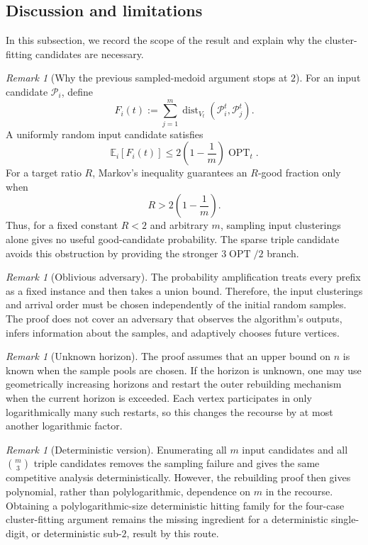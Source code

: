 \documentclass[11pt]{article}
\theoremstyle{definition}
\theoremstyle{remark}
\newtheorem{remark}[theorem]{Remark}
\newcommand{\Pp}{\mathcal P}
\newcommand{\OPT}{\operatorname{OPT}}
\newcommand{\dist}{\operatorname{dist}}
\newcommand{\1}{\mathbf 1}
\begin{document}
\subsection{Discussion and limitations}

In this subsection, we record the scope of the result and explain why the
cluster-fitting candidates are necessary.

\begin{remark}[Why the previous sampled-medoid argument stops at $2$]
For an input candidate $\Pp_i$, define
\[
 F_i(t):=\sum_{j=1}^m\dist_{V_t}(\Pp_i^t,\Pp_j^t).
\]
A uniformly random input candidate satisfies
\[
 \mathbb E_i[F_i(t)]
 \le2\left(1-\frac1m\right)\OPT_t.
\]
For a target ratio $R$, Markov's inequality guarantees an $R$-good fraction
only when
\[
 R>2\left(1-\frac1m\right).
\]
Thus, for a fixed constant $R<2$ and arbitrary $m$, sampling input
clusterings alone gives no useful good-candidate probability.  The sparse
triple candidate avoids this obstruction by providing the stronger
$3\OPT/2$ branch.
\end{remark}

\begin{remark}[Oblivious adversary]
The probability amplification treats every prefix as a fixed instance and
then takes a union bound.  Therefore, the input clusterings and arrival order
must be chosen independently of the initial random samples.  The proof does
not cover an adversary that observes the algorithm's outputs, infers
information about the samples, and adaptively chooses future vertices.
\end{remark}

\begin{remark}[Unknown horizon]
The proof assumes that an upper bound on $n$ is known when the sample pools
are chosen.  If the horizon is unknown, one may use geometrically increasing
horizons and restart the outer rebuilding mechanism when the current horizon
is exceeded.  Each vertex participates in only logarithmically many such
restarts, so this changes the recourse by at most another logarithmic factor.
\end{remark}

\begin{remark}[Deterministic version]
Enumerating all $m$ input candidates and all $\binom m3$ triple candidates
removes the sampling failure and gives the same competitive analysis
deterministically.  However, the rebuilding proof then gives polynomial,
rather than polylogarithmic, dependence on $m$ in the recourse.  Obtaining a
polylogarithmic-size deterministic hitting family for the four-case
cluster-fitting argument remains the missing ingredient for a deterministic
single-digit, or deterministic sub-$2$, result by this route.
\end{remark}
\end{document}
